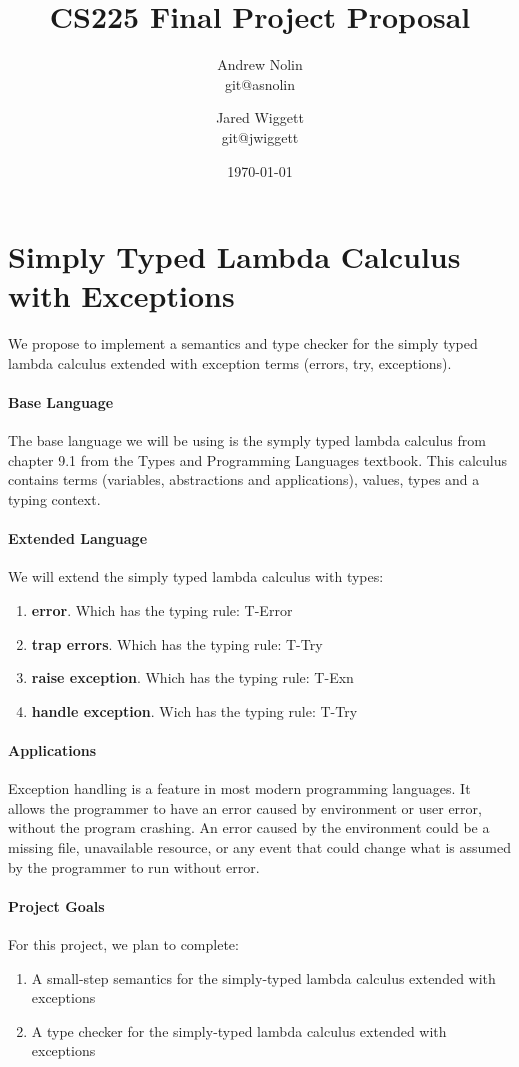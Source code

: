 \documentclass{article}
\title{CS225 Final Project Proposal}
\author{Andrew Nolin \\ git@asnolin \and Jared Wiggett \\ git@jwiggett}
\date{\today}
\begin{document}
\maketitle
\section*{Simply Typed Lambda Calculus with Exceptions}
We propose to implement a semantics and type checker for the simply typed lambda calculus extended with exception terms (errors, try, exceptions). 


\paragraph{Base Language}
The base language we will be using is the symply typed lambda calculus from chapter 9.1 from the Types and Programming Languages textbook. This calculus contains terms (variables, abstractions and  applications), values, types and a typing context.
\paragraph{Extended Language}
We will extend the simply typed lambda calculus with types: 
\begin{enumerate}
	\item \textbf{error}. Which has the typing rule: T-Error
	\item \textbf{trap errors}. Which has the typing rule: T-Try
	\item \textbf{raise exception}. Which has the typing rule: T-Exn
	\item \textbf{handle exception}. Wich has the typing rule: T-Try
\end{enumerate}
\paragraph{Applications}
Exception handling is a feature in most modern programming languages. It allows the programmer to have an error caused by environment or user error, without the program crashing. An error caused by the environment could be a missing file, unavailable resource, or any event that could change what is assumed by the programmer to run without error. 
\paragraph{Project Goals}
For this project, we plan to complete:
\begin{enumerate}
\item A small-step semantics for the simply-typed lambda calculus extended with exceptions
\item A type checker for the simply-typed lambda calculus extended with exceptions
\end{enumerate}
\end{document}
